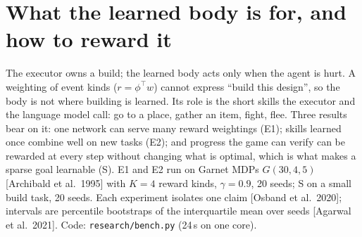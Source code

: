 \section*{What the learned body is for, and how to reward it}
The executor owns a build; the learned body acts only when the agent is hurt. A weighting of event kinds ($r=\phi^\top
w$) cannot express ``build this design'', so the body is not where building is learned. Its role is the short skills
the executor and the language model call: go to a place, gather an item, fight, flee. Three results bear on it: one
network can serve many reward weightings (E1); skills learned once combine well on new tasks (E2); and progress the
game can verify can be rewarded at every step without changing what is optimal, which is what makes a sparse goal
learnable (S). E1 and E2 run on Garnet MDPs $G(30,4,5)$ [Archibald et al.\ 1995] with $K=4$ reward kinds, $\gamma=0.9$, 20
seeds; S on a small build task, 20 seeds. Each experiment isolates one claim [Osband et al.\ 2020]; intervals are
percentile bootstraps of the interquartile mean over seeds [Agarwal et al.\ 2021]. Code: \texttt{research/bench.py}
(24\,s on one core).

